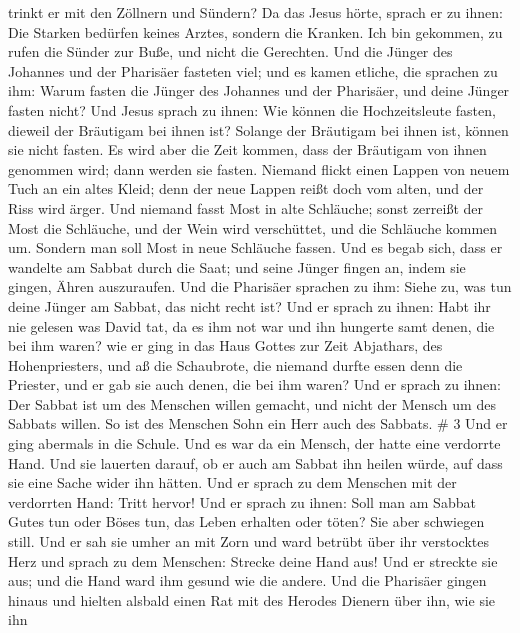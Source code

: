trinkt er mit den Zöllnern und Sündern?  Da das Jesus
hörte, sprach er zu ihnen: Die Starken bedürfen keines Arztes, sondern
die Kranken. Ich bin gekommen, zu rufen die Sünder zur Buße, und nicht
die Gerechten.  Und die Jünger des Johannes und der
Pharisäer fasteten viel; und es kamen etliche, die sprachen zu ihm:
Warum fasten die Jünger des Johannes und der Pharisäer, und deine Jünger
fasten nicht?  Und Jesus sprach zu ihnen: Wie können die
Hochzeitsleute fasten, dieweil der Bräutigam bei ihnen ist? Solange der
Bräutigam bei ihnen ist, können sie nicht fasten.  Es wird
aber die Zeit kommen, dass der Bräutigam von ihnen genommen wird; dann
werden sie fasten.  Niemand flickt einen Lappen von neuem
Tuch an ein altes Kleid; denn der neue Lappen reißt doch vom alten, und
der Riss wird ärger.  Und niemand fasst Most in alte
Schläuche; sonst zerreißt der Most die Schläuche, und der Wein wird
verschüttet, und die Schläuche kommen um. Sondern man soll Most in neue
Schläuche fassen.  Und es begab sich, dass er wandelte am
Sabbat durch die Saat; und seine Jünger fingen an, indem sie gingen,
Ähren auszuraufen.  Und die Pharisäer sprachen zu ihm:
Siehe zu, was tun deine Jünger am Sabbat, das nicht recht ist?
 Und er sprach zu ihnen: Habt ihr nie gelesen was David
tat, da es ihm not war und ihn hungerte samt denen, die bei ihm waren?
 wie er ging in das Haus Gottes zur Zeit Abjathars, des
Hohenpriesters, und aß die Schaubrote, die niemand durfte essen denn die
Priester, und er gab sie auch denen, die bei ihm waren? 
Und er sprach zu ihnen: Der Sabbat ist um des Menschen willen gemacht,
und nicht der Mensch um des Sabbats willen.  So ist des
Menschen Sohn ein Herr auch des Sabbats. \# 3  Und er ging
abermals in die Schule. Und es war da ein Mensch, der hatte eine
verdorrte Hand.  Und sie lauerten darauf, ob er auch am
Sabbat ihn heilen würde, auf dass sie eine Sache wider ihn hätten.
 Und er sprach zu dem Menschen mit der verdorrten Hand:
Tritt hervor!  Und er sprach zu ihnen: Soll man am Sabbat
Gutes tun oder Böses tun, das Leben erhalten oder töten? Sie aber
schwiegen still.  Und er sah sie umher an mit Zorn und ward
betrübt über ihr verstocktes Herz und sprach zu dem Menschen: Strecke
deine Hand aus! Und er streckte sie aus; und die Hand ward ihm gesund
wie die andere.  Und die Pharisäer gingen hinaus und hielten
alsbald einen Rat mit des Herodes Dienern über ihn, wie sie ihn
